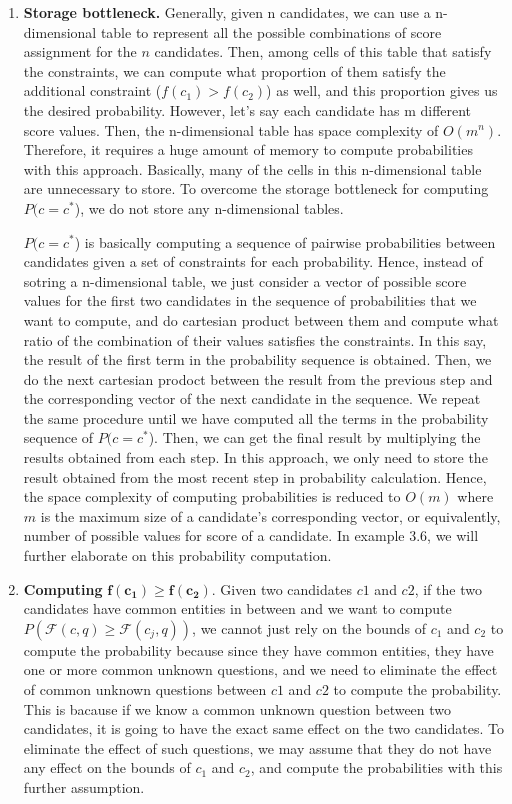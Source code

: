 \begin{enumerate}
    \item \textbf{Storage bottleneck.} Generally, given n candidates, we can use a n-dimensional table to represent all the possible combinations of score assignment for the $n$ candidates. Then, among cells of this table that satisfy the constraints, we can compute what proportion of them satisfy the additional constraint (\( f(c_1) > f(c_2) \)) as well, and this proportion gives us the desired probability. However, let's say each candidate has m different score values. Then, the n-dimensional table has space complexity of $O(m^n)$. Therefore, it requires a huge amount of memory to compute probabilities with this approach. Basically, many of the cells in this n-dimensional table are unnecessary to store. To overcome the storage bottleneck for computing $P(c = c^*$), we do not store any n-dimensional tables. 
    
    $P(c = c^*$) is basically computing a sequence of pairwise probabilities between candidates given a set of constraints for each probability.  Hence, instead of sotring a n-dimensional table, we just consider a vector of possible score values for the first two candidates in the sequence of probabilities that we want to compute, and do cartesian product between them and compute what ratio of the combination of their values satisfies the constraints. In this say, the result of the first term in the probability sequence is obtained. Then, we do the next cartesian prodoct between the result from the previous step and the corresponding vector of the next candidate in the sequence. We repeat the same procedure until we have computed all the terms in the probability sequence of $P(c = c^*$). Then, we can get the final result by multiplying the results obtained from each step. In this approach, we only need to store the result obtained from the most recent step in probability calculation. Hence, the space complexity of computing probabilities is reduced to $O(m)$ where $m$ is the maximum size of a candidate's corresponding vector, or equivalently, number of possible values for score of a candidate. In example 3.6, we will further elaborate on this probability computation.
    \item \textbf{Computing} $\mathbf{f(c_1) \geq f(c_2).}$ Given two candidates $c1$ and $c2$, if the two candidates have common entities in between and we want to compute $P(\mathcal{F}(c, q) \geq \mathcal{F}(c_j, q))$, we cannot just rely on the bounds of $c_1$ and $c_2$ to compute the probability because since they have common entities, they have one or more common unknown questions, and we need to eliminate the effect of common unknown questions between $c1$ and $c2$ to compute the probability. This is bacause if we know a common unknown question between two candidates, it is  going to have the exact same effect on the two candidates. To eliminate the effect of such questions, we may assume that they do not have any effect on the bounds of $c_1$ and $c_2$, and compute the probabilities with this further assumption. 
\end{enumerate}

